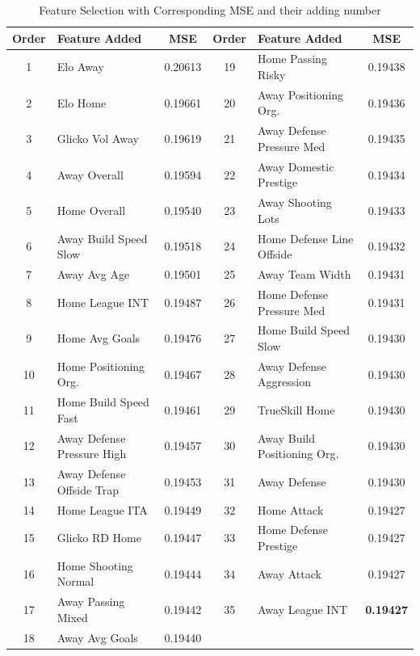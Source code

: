 \begin{table}[H]
    \centering
    \caption{Feature Selection with Corresponding MSE and their adding number}
    \label{tab:feature_mse}
    \begin{tabular}{|c|l|c|c|l|c|}
        \hline
        \textbf{Order} & \textbf{Feature Added} & \textbf{MSE} & \textbf{Order} & \textbf{Feature Added} & \textbf{MSE} \\
        \hline
        1  & Elo Away & 0.20613 & 19 & Home Passing Risky & 0.19438 \\
        2  & Elo Home & 0.19661 & 20 & Away Positioning Org. & 0.19436 \\
        3  & Glicko Vol Away & 0.19619 & 21 & Away Defense Pressure Med & 0.19435 \\
        4  & Away Overall & 0.19594 & 22 & Away Domestic Prestige & 0.19434 \\
        5  & Home Overall & 0.19540 & 23 & Away Shooting Lots & 0.19433 \\
        6  & Away Build Speed Slow & 0.19518 & 24 & Home Defense Line Offside & 0.19432 \\
        7  & Away Avg Age & 0.19501 & 25 & Away Team Width & 0.19431 \\
        8  & Home League INT & 0.19487 & 26 & Home Defense Pressure Med & 0.19431 \\
        9  & Home Avg Goals & 0.19476 & 27 & Home Build Speed Slow & 0.19430 \\
        10 & Home Positioning Org. & 0.19467 & 28 & Away Defense Aggression & 0.19430 \\
        11 & Home Build Speed Fast & 0.19461 & 29 & TrueSkill Home & 0.19430 \\
        12 & Away Defense Pressure High & 0.19457 & 30 & Away Build Positioning Org. & 0.19430 \\
        13 & Away Defense Offside Trap & 0.19453 & 31 & Away Defense & 0.19430 \\
        14 & Home League ITA & 0.19449 & 32 & Home Attack & 0.19427 \\
        15 & Glicko RD Home & 0.19447 & 33 & Home Defense Prestige & 0.19427 \\
        16 & Home Shooting Normal & 0.19444 & 34 & Away Attack & 0.19427 \\
        17 & Away Passing Mixed & 0.19442 & 35 & Away League INT & \textbf{0.19427} \\
        18 & Away Avg Goals & 0.19440 & & \\
        \hline
    \end{tabular}
\end{table}

